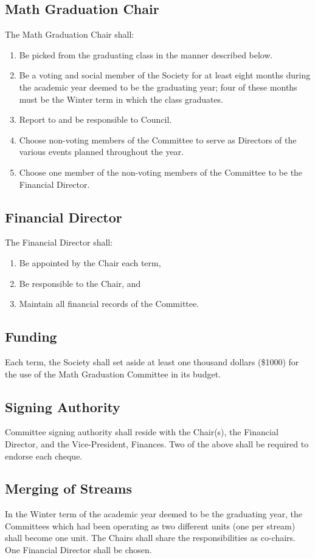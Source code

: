 \subsection{Math Graduation Chair}
The Math Graduation Chair shall:
\begin{enumerate}
\item Be picked from the graduating class in the manner described below.
\item Be a voting and social member of the Society for at least eight months during the academic year deemed to be the graduating year; four of these months must be the Winter term in which the class graduates.
\item Report to and be responsible to Council.
\item Choose non-voting members of the Committee to serve as Directors of the various events planned throughout the year.
\item Choose one member of the non-voting members of the Committee to be the Financial Director.
\end{enumerate}

\subsection{Financial Director}
The Financial Director shall:
\begin{enumerate}
\item Be appointed by the Chair each term,
\item Be responsible to the Chair, and
\item Maintain all financial records of the Committee.
\end{enumerate}

\subsection{Funding}
Each term, the Society shall set aside at least one thousand dollars (\$1000) for the use of the Math Graduation Committee in its budget.

\subsection{Signing Authority}
Committee signing authority shall reside with the Chair(s), the Financial Director, and the Vice-President, Finances. Two of the above shall be required to endorse each cheque.

\subsection{Merging of Streams}
In the Winter term of the academic year deemed to be the graduating year, the Committees which had been operating as two different units (one per stream) shall become one unit.
The Chairs shall share the responsibilities as co-chairs.
One Financial Director shall be chosen.

